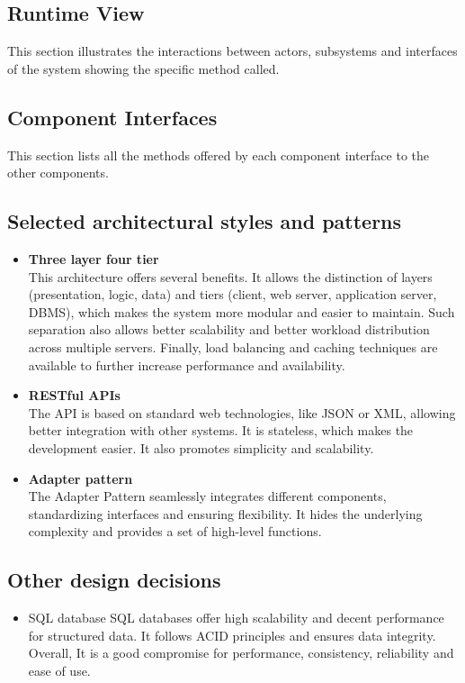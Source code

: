\subsection{Runtime View}
This section illustrates the interactions between actors, subsystems and interfaces of the system showing the specific method called.

\subsection{Component Interfaces}
This section lists all the methods offered by each component interface to the other components.

\subsection{Selected architectural styles and patterns}
\begin{itemize}
    \item \textbf{Three layer four tier}\\
    This architecture offers several benefits. It allows the distinction of layers (presentation, logic, data) and tiers (client, web server, application server, DBMS), which makes the system more modular and easier to maintain. Such separation also allows better scalability and better workload distribution across multiple servers. Finally, load balancing and caching techniques are available to further increase performance and availability.

    \item \textbf{RESTful APIs}\\
    The API is based on standard web technologies, like JSON or XML, allowing better integration with other systems. It is stateless, which makes the development easier. It also promotes simplicity and scalability.\\
    \item \textbf{Adapter pattern}\\
    The Adapter Pattern seamlessly integrates different components, standardizing interfaces and ensuring flexibility. It hides the underlying complexity and provides a set of high-level functions. 
\end{itemize}

\vspace{1cm}
    
\subsection{Other design decisions}
\begin{itemize}
    \item SQL database
    SQL databases offer high scalability and decent performance for structured data. It follows ACID principles and ensures data integrity. Overall, It is a good compromise for performance, consistency, reliability and ease of use.
\end{itemize}